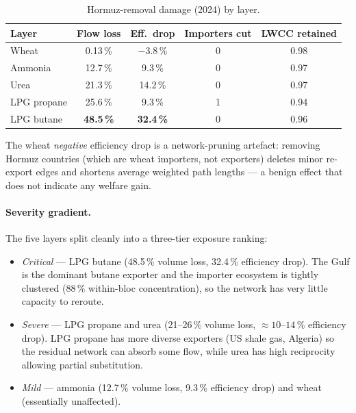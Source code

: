 \documentclass[11pt,a4paper]{article}
\begin{document}
\begin{table}[H]
\centering
\small
\caption{Hormuz-removal damage (2024) by layer.}
\label{tab:attack}
\begin{tabular}{lcccc}
\toprule
Layer & Flow loss & Eff.\ drop & Importers cut & LWCC retained \\
\midrule
Wheat       & 0.13\,\% & $-3.8$\,\% & 0 & 0.98 \\
Ammonia     & 12.7\,\% & 9.3\,\% & 0 & 0.97 \\
Urea        & 21.3\,\% & 14.2\,\% & 0 & 0.97 \\
LPG propane & 25.6\,\% & 9.3\,\% & 1 & 0.94 \\
LPG butane  & \textbf{48.5\,\%} & \textbf{32.4\,\%} & 0 & 0.96 \\
\bottomrule
\end{tabular}
\end{table}

The wheat \emph{negative} efficiency drop is a network-pruning
artefact: removing Hormuz countries (which are wheat importers,
not exporters) deletes minor re-export edges and shortens average
weighted path lengths --- a benign effect that does not indicate any
welfare gain.

\paragraph{Severity gradient.}
The five layers split cleanly into a three-tier exposure ranking:

\begin{itemize}[leftmargin=1.4em, itemsep=0.1em]
  \item \emph{Critical} --- LPG butane (48.5\,\% volume loss,
        32.4\,\% efficiency drop). The Gulf is the dominant
        butane exporter and the importer ecosystem is tightly
        clustered (88\,\% within-bloc concentration), so the network
        has very little capacity to reroute.
  \item \emph{Severe} --- LPG propane and urea
        (21--26\,\% volume loss, $\approx\!10$--$14$\,\%
        efficiency drop). LPG propane has more diverse exporters
        (US shale gas, Algeria) so the residual network can absorb
        some flow, while urea has high reciprocity allowing
        partial substitution.
  \item \emph{Mild} --- ammonia (12.7\,\% volume loss, 9.3\,\%
        efficiency drop) and wheat (essentially unaffected).
\end{itemize}
\end{document}
